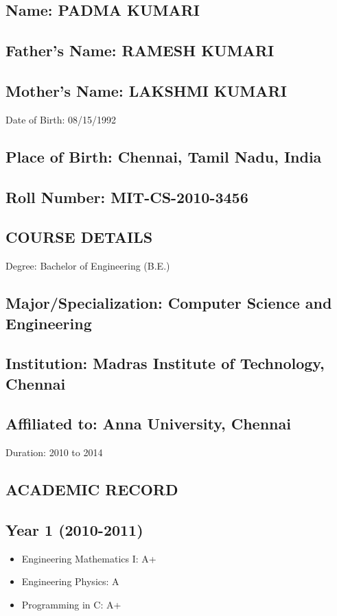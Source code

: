 \subsection*{Name: PADMA KUMARI}

\subsection*{Father's Name: RAMESH KUMARI}

\subsection*{Mother's Name: LAKSHMI KUMARI}

Date of Birth: 08/15/1992

\subsection*{Place of Birth: Chennai, Tamil Nadu, India}

\subsection*{Roll Number: MIT-CS-2010-3456}

\subsection*{COURSE DETAILS}

Degree: Bachelor of Engineering (B.E.)

\subsection*{Major/Specialization: Computer Science and Engineering}

\subsection*{Institution: Madras Institute of Technology, Chennai}

\subsection*{Affiliated to: Anna University, Chennai}

Duration: 2010 to 2014

\subsection*{ACADEMIC RECORD}

\subsection*{Year 1 (2010-2011)}

\begin{itemize}

\item Engineering Mathematics I: A+

\item Engineering Physics: A

\item Programming in C: A+

\end{itemize}